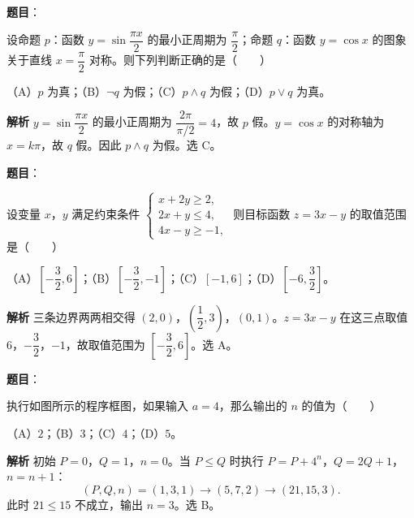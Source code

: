 \begin{answer}

\textbf{题目}：

设命题 $p$：函数 $y=\sin\dfrac{\pi x}2$ 的最小正周期为 $\dfrac\pi2$；命题 $q$：函数 $y=\cos x$ 的图象关于直线 $x=\dfrac\pi2$ 对称。则下列判断正确的是\mbox{（　　）}

（A）$p$ 为真；（B）$\neg q$ 为假；（C）$p\wedge q$ 为假；（D）$p\vee q$ 为真。

\textbf{解析}
$y=\sin\dfrac{\pi x}2$ 的最小正周期为 $\dfrac{2\pi}{\pi/2}=4$，故 $p$ 假。$y=\cos x$ 的对称轴为 $x=k\pi$，故 $q$ 假。因此 $p\wedge q$ 为假。选 C。


\end{answer}
\begin{answer}

\textbf{题目}：

设变量 $x$，$y$ 满足约束条件 $\begin{cases}x+2y\geqslant2,\\2x+y\leqslant4,\\4x-y\geqslant-1,\end{cases}$ 则目标函数 $z=3x-y$ 的取值范围是\mbox{（　　）}

（A）$\left[-\dfrac32,6\right]$；（B）$\left[-\dfrac32,-1\right]$；（C）$[-1,6]$；（D）$\left[-6,\dfrac32\right]$。

\textbf{解析}
三条边界两两相交得 $(2,0)$，$\left(\dfrac12,3\right)$，$(0,1)$。$z=3x-y$ 在这三点取值 $6$，$-\dfrac32$，$-1$，故取值范围为 $\left[-\dfrac32,6\right]$。选 A。


\end{answer}
\begin{answer}

\textbf{题目}：

执行如图所示的程序框图，如果输入 $a=4$，那么输出的 $n$ 的值为\mbox{（　　）}
\nopagebreak[4]
\begin{center}\end{center}
\nopagebreak[4]
（A）$2$；（B）$3$；（C）$4$；（D）$5$。

\textbf{解析}
初始 $P=0$，$Q=1$，$n=0$。当 $P\leqslant Q$ 时执行 $P=P+4^n$，$Q=2Q+1$，$n=n+1$：
\nopagebreak[4]
\[(P,Q,n)=(1,3,1)\to(5,7,2)\to(21,15,3).\]
此时 $21\leqslant15$ 不成立，输出 $n=3$。选 B。


\end{answer}
